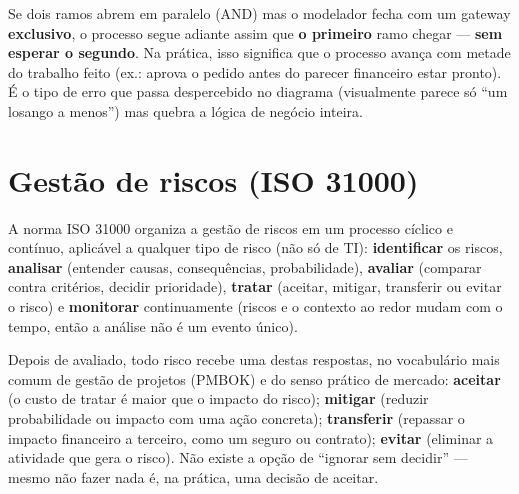\begin{cuidado}
Se dois ramos abrem em paralelo (AND) mas o modelador fecha com um gateway
\textbf{exclusivo}, o processo segue adiante assim que \textbf{o primeiro}
ramo chegar --- \textbf{sem esperar o segundo}. Na prática, isso significa
que o processo avança com metade do trabalho feito (ex.: aprova o pedido
antes do parecer financeiro estar pronto). É o tipo de erro que passa
despercebido no diagrama (visualmente parece só “um losango a menos”) mas
quebra a lógica de negócio inteira.
\end{cuidado}

\section{Gestão de riscos (ISO 31000)}

\begin{conceito}
A norma ISO 31000 organiza a gestão de riscos em um processo cíclico e
contínuo, aplicável a qualquer tipo de risco (não só de TI):
\textbf{identificar} os riscos, \textbf{analisar} (entender causas,
consequências, probabilidade), \textbf{avaliar} (comparar contra critérios,
decidir prioridade), \textbf{tratar} (aceitar, mitigar, transferir ou
evitar o risco) e \textbf{monitorar} continuamente (riscos e o contexto ao
redor mudam com o tempo, então a análise não é um evento único).
\end{conceito}

\begin{regrapratica}
Depois de avaliado, todo risco recebe uma destas respostas, no vocabulário
mais comum de gestão de projetos (PMBOK) e do senso prático de mercado:
\textbf{aceitar} (o custo de tratar é maior que o impacto do risco);
\textbf{mitigar} (reduzir probabilidade ou impacto com uma ação concreta);
\textbf{transferir} (repassar o impacto financeiro a terceiro, como um
seguro ou contrato); \textbf{evitar} (eliminar a atividade que gera o
risco). Não existe a opção de “ignorar sem decidir” --- mesmo não fazer
nada é, na prática, uma decisão de aceitar.
\end{regrapratica}

